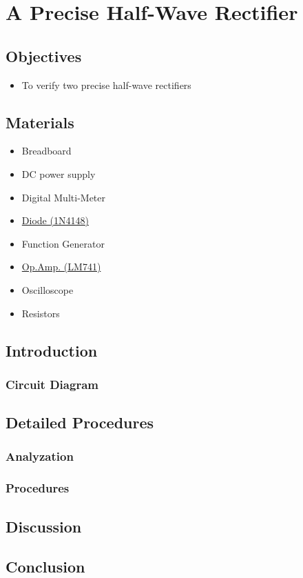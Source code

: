 \chapter{A Precise Half-Wave Rectifier}


\section{Objectives}
\begin{itemize}
    \item To verify two precise half-wave rectifiers
\end{itemize}

\section{Materials}
\begin{itemize}
    \item Breadboard
    \item DC power supply
    \item Digital Multi-Meter
    \item \hyperref[1N4148]{Diode (1N4148)}
    \item Function Generator
    \item \hyperref[LM741_1]{Op.Amp. (LM741)}
    \item Oscilloscope
    \item Resistors
\end{itemize}

\section{Introduction}
    \subsection{Circuit Diagram}


\section{Detailed Procedures}
    \subsection{Analyzation}


    \subsection{Procedures}

    
\section{Discussion}


\section{Conclusion}